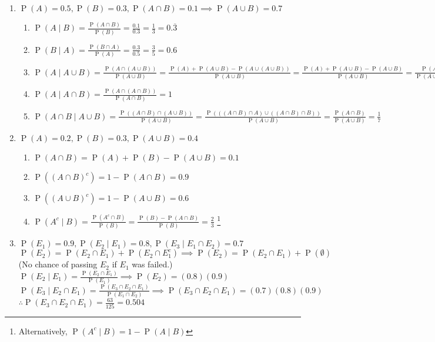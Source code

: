 \documentclass{article}
\title{\MakeUppercase{\jobname}}
\author{Justin Nguyen}
\date{\today}
\newcommand{\pr}[1]{\operatorname{P} (#1)}
\begin{document}
\maketitle

\begin{enumerate}
  \item $\pr{A} = 0.5, \pr{B} = 0.3, \pr{A\cap B} = 0.1 \implies \pr{A\cup B} = 0.7$
  \begin{enumerate}
    \item $\pr{A \mid B} = \frac{\pr{A\cap B}}{\pr{B}} = \frac{0.1}{0.3} = \frac{1}{3} = 0.\overline{3}$
    \item $\pr{B \mid A} = \frac{\pr{B\cap A}}{\pr{A}} = \frac{0.3}{0.5} = \frac{3}{5} = 0.6$
    \item $\pr{A\mid A\cup B} 
    = \frac{\pr{A \cap (A \cup B)}}{\pr{A \cup B}}
    = \frac{\pr{A} + \pr{A \cup B} - \pr{A \cup (A \cup B)}}{\pr{A \cup B}}
    = \frac{\pr{A} + \pr{A \cup B} - \pr{A \cup B}}{\pr{A \cup B}}
    = \frac{\pr{A}}{\pr{A \cup B}} = \frac{1}{2}$
    \item $\pr{A\mid A\cap B} = \frac{\pr{A \cap (A \cap B)}}{\pr{A \cap B}} = 1$
    \item $\pr{A \cap B\mid A\cup B} 
    = \frac{\pr{(A \cap B) \cap (A\cup B)}}{\pr{A \cup B}}
    = \frac{\pr{((A \cap B) \cap A) \cup  ((A \cap B) \cap B)}}{\pr{A \cup B}}
    = \frac{\pr{A \cap B}}{\pr{A \cup B}} = \frac{1}{7}$
  \end{enumerate}
  
  \item $\pr{A} = 0.2, \pr{B} = 0.3, \pr{A \cup B} = 0.4$ 
  \begin{enumerate}
    \item $\pr{A \cap B} = \pr{A} + \pr{B} - \pr{A \cup B} = 0.1$
    \item $\pr{(A\cap B)^c} = 1 - \pr{A \cap B} = 0.9$
    \item $\pr{(A \cup B)^c} = 1 - \pr{A \cup B} = 0.6$
    \item $\pr{A^c \mid B}
    = \frac{\pr{A^c \cap B}}{\pr{B}}
    = \frac{\pr{B} - \pr{A \cap B}}{\pr{B}} = \frac{2}{3}$
    \footnote{Alternatively, $\pr{A^c \mid B} = 1 - \pr{A \mid B}$}
  \end{enumerate}
  
  \item $\pr{E_1} = 0.9, \pr{E_2 \mid E_1} = 0.8, \pr{E_3 \mid E_1 \cap E_2} = 0.7$\\
  $\pr{E_2} = \pr{E_2 \cap E_1} + \pr{E_2 \cap E_1^c} 
  \implies \pr{E_2} = \pr{E_2 \cap E_1} + \pr{\emptyset}$ (No chance of passing $E_2$ if $E_1$ was failed.)\\
  $\pr{E_2 \mid E_1} = \frac{\pr{E_2 \cap E_1}}{\pr{E_1}} \implies \pr{E_2} = (0.8)(0.9)$\\
  $\pr{E_3 \mid E_2 \cap E_1} = \frac{\pr{E_3 \cap E_2 \cap E_1}}{\pr{E_1 \cap E_2}} \implies \pr{E_3 \cap E_2 \cap E_1} = (0.7)(0.8)(0.9)$\\
  $\therefore \pr{E_3 \cap E_2 \cap E_1} = \frac{63}{125} = 0.504$
  

\end{enumerate}
\end{document}
